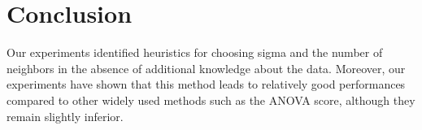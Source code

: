 \documentclass[11pt]{article}
\begin{document}
\section{Conclusion}

Our experiments identified heuristics for choosing sigma and the number of neighbors in the absence of additional knowledge about the data. Moreover, our experiments have shown that this method leads to relatively good performances compared to other widely used methods such as the ANOVA score, although they remain slightly inferior.


\newpage


\end{document}
